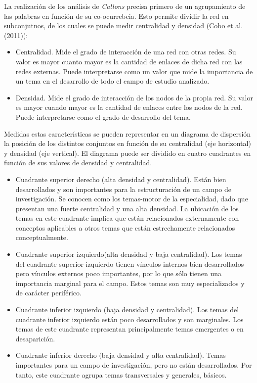 \documentclass[
]{article}
\begin{document}
La realización de los análisis de \emph{Callons} precisa primero de un
agrupamiento de las palabras en función de su co-ocurrebcia. Esto
permite dividir la red en subconjutnos, de los cuales se puede medir
centralidad y densidad (Cobo et al. (2011)):

\begin{itemize}
\item
  Centralidad. Mide el grado de interacción de una red con otras redes.
  Su valor es mayor cuanto mayor es la cantidad de enlaces de dicha red
  con las redes externas. Puede interpretarse como un valor que mide la
  importancia de un tema en el desarrollo de todo el campo de estudio
  analizado.
\item
  Densidad. Mide el grado de interacción de los nodos de la propia red.
  Su valor es mayor cuando mayor es la cantidad de enlaces entre los
  nodos de la red. Puede interpretarse como el grado de desarrollo del
  tema.
\end{itemize}

Medidas estas características se pueden representar en un diagrama de
dispersión la posición de los distintos conjuntos en función de su
centralidad (eje horizontal) y densidad (eje vertical). El diagrama
puede ser dividido en cuatro cuadrantes en función de sus valores de
densidad y centralidad.

\begin{itemize}
\item
  Cuadrante superior derecho (alta densidad y centralidad). Están bien
  desarrollados y son importantes para la estructuración de un campo de
  investigación. Se conocen como los temas-motor de la especialidad,
  dado que presentan una fuerte centralidad y una alta densidad. La
  ubicación de los temas en este cuadrante implica que están
  relacionados externamente con conceptos aplicables a otros temas que
  están estrechamente relacionados conceptualmente.
\item
  Cuadrante superior izquierdo(alta densidad y baja centralidad). Los
  temas del cuadrante superior izquierdo tienen vínculos internos bien
  desarrollados pero vínculos externos poco importantes, por lo que sólo
  tienen una importancia marginal para el campo. Estos temas son muy
  especializados y de carácter periférico.
\item
  Cuadrante inferior izquierdo (baja densidad y centralidad). Los temas
  del cuadrante inferior izquierdo están poco desarrollados y son
  marginales. Los temas de este cuadrante representan principalmente
  temas emergentes o en desaparición.
\item
  Cuadrante inferior derecho (baja densidad y alta centralidad). Temas
  importantes para un campo de investigación, pero no están
  desarrollados. Por tanto, este cuadrante agrupa temas transversales y
  generales, básicos.
\end{itemize}
\end{document}
